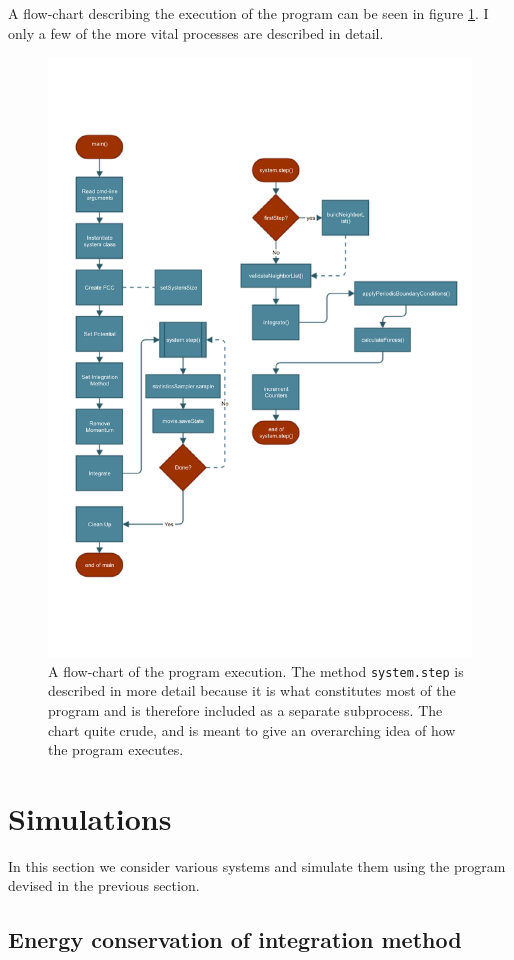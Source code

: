 \documentclass[a4paper]{article}
\begin{document}
    A flow-chart describing the execution of the program can be seen in
    figure \ref{fig:flowchart}. I only a few of the more vital processes are
    described in detail.
    \begin{figure}[h]
        \centering \includegraphics[width=0.8\linewidth]{flow_chart.pdf}
        \caption[Flow chart]{A flow-chart of the program execution. The method
            \texttt{system.step} is described in more detail because it is what
            constitutes most of the program and is therefore included as a
        separate subprocess. The chart quite crude, and is meant to give an
    overarching idea of how the program executes.}
        \label{fig:flowchart}
    \end{figure}
\section{Simulations}
\label{sec:simulations}

In this section we consider various systems and simulate them using the program
devised in the previous section.

    \subsection{Energy conservation of integration method}
    \label{sub:energy_conservation_of_integration_method}
\end{document}
